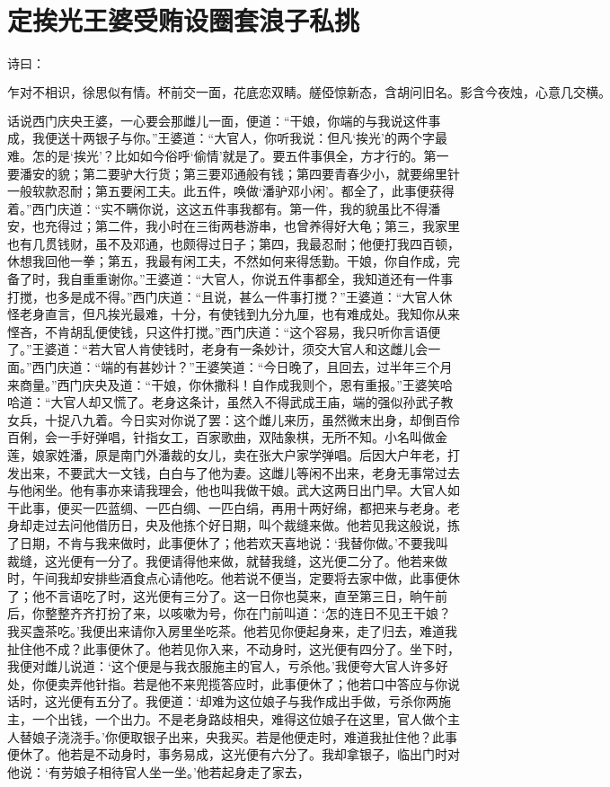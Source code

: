 

\chapter{定挨光王婆受贿\KG 设圈套浪子私挑}


诗曰：

\[
乍对不相识，徐思似有情。杯前交一面，花底恋双睛。
艖俹惊新态，含胡问旧名。影含今夜烛，心意几交横。
\]

话说西门庆央王婆，一心要会那雌儿一面，便道：“干娘，你端的与我说这件事成，我便送十两银子与你。”王婆道：“大官人，你听我说：但凡‘挨光’的两个字最难。怎的是‘挨光’？比如如今俗呼‘偷情’就是了。要五件事俱全，方才行的。第一要潘安的貌；第二要驴大行货；第三要邓通般有钱；第四要青春少小，就要绵里针一般软款忍耐；第五要闲工夫。此五件，唤做‘潘驴邓小闲’。都全了，此事便获得着。”西门庆道：“实不瞒你说，这这五件事我都有。第一件，我的貌虽比不得潘安，也充得过；第二件，我小时在三街两巷游串，也曾养得好大龟；第三，我家里也有几贯钱财，虽不及邓通，也颇得过日子；第四，我最忍耐；他便打我四百顿，休想我回他一拳；第五，我最有闲工夫，不然如何来得恁勤。干娘，你自作成，完备了时，我自重重谢你。”王婆道：“大官人，你说五件事都全，我知道还有一件事打搅，也多是成不得。”西门庆道：“且说，甚么一件事打搅？”王婆道：“大官人休怪老身直言，但凡挨光最难，十分，有使钱到九分九厘，也有难成处。我知你从来悭吝，不肯胡乱便使钱，只这件打搅。”西门庆道：“这个容易，我只听你言语便了。”王婆道：“若大官人肯使钱时，老身有一条妙计，须交大官人和这雌儿会一面。”西门庆道：“端的有甚妙计？”王婆笑道：“今日晚了，且回去，过半年三个月来商量。”西门庆央及道：“干娘，你休撒科！自作成我则个，恩有重报。”王婆笑哈哈道：“大官人却又慌了。老身这条计，虽然入不得武成王庙，端的强似孙武子教女兵，十捉八九着。今日实对你说了罢：这个雌儿来历，虽然微末出身，却倒百伶百俐，会一手好弹唱，针指女工，百家歌曲，双陆象棋，无所不知。小名叫做金莲，娘家姓潘，原是南门外潘裁的女儿，卖在张大户家学弹唱。后因大户年老，打发出来，不要武大一文钱，白白与了他为妻。这雌儿等闲不出来，老身无事常过去与他闲坐。他有事亦来请我理会，他也叫我做干娘。武大这两日出门早。大官人如干此事，便买一匹蓝绸、一匹白绸、一匹白绢，再用十两好绵，都把来与老身。老身却走过去问他借历日，央及他拣个好日期，叫个裁缝来做。他若见我这般说，拣了日期，不肯与我来做时，此事便休了；他若欢天喜地说：‘我替你做。’不要我叫裁缝，这光便有一分了。我便请得他来做，就替我缝，这光便二分了。他若来做时，午间我却安排些酒食点心请他吃。他若说不便当，定要将去家中做，此事便休了；他不言语吃了时，这光便有三分了。这一日你也莫来，直至第三日，晌午前后，你整整齐齐打扮了来，以咳嗽为号，你在门前叫道：‘怎的连日不见王干娘？我买盏茶吃。’我便出来请你入房里坐吃茶。他若见你便起身来，走了归去，难道我扯住他不成？此事便休了。他若见你入来，不动身时，这光便有四分了。坐下时，我便对雌儿说道：‘这个便是与我衣服施主的官人，亏杀他。’我便夸大官人许多好处，你便卖弄他针指。若是他不来兜揽答应时，此事便休了；他若口中答应与你说话时，这光便有五分了。我便道：‘却难为这位娘子与我作成出手做，亏杀你两施主，一个出钱，一个出力。不是老身路歧相央，难得这位娘子在这里，官人做个主人替娘子浇浇手。’你便取银子出来，央我买。若是他便走时，难道我扯住他？此事便休了。他若是不动身时，事务易成，这光便有六分了。我却拿银子，临出门时对他说：‘有劳娘子相待官人坐一坐。’他若起身走了家去，